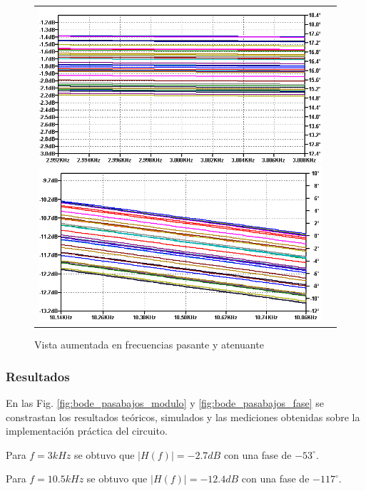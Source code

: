 \begin{figure}[H]
    \centering
    \begin{tabular}{c c}
        \includegraphics[scale=0.4]{../EJ2/Recursos/lp_montecarlo_fp.png}
        \includegraphics[scale=0.4]{../EJ2/Recursos/lp_montecarlo_fa.png}
    \end{tabular}
    \caption{Vista aumentada en frecuencias pasante y atenuante}
    \label{fig:lp_montecarlo_frecuencias}
\end{figure}

\subsubsection{Resultados}
En las Fig. \ref{fig:bode_pasabajos_modulo} y \ref{fig:bode_pasabajos_fase} se constrastan los resultados te\'oricos, simulados y las mediciones obtenidas sobre la implementaci\'on
pr\'actica del circuito.

Para $f = 3kHz$ se obtuvo que $|H(f)| = -2.7dB$ con una fase de $-53^{\circ}$.

Para $f = 10.5kHz$ se obtuvo que $|H(f)| = -12.4dB$ con una fase de $-117^{\circ}$.


